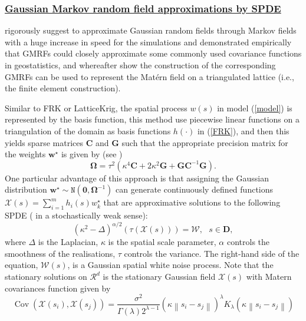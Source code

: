 \documentclass[
12pt, %
a4paper, %
oneside, %
headinclude,footinclude, %
BCOR5mm, %
]{scrartcl}
\begin{document}
\subsubsection{\href{http://www.r-inla.org/}{Gaussian Markov random field approximations by SPDE}}
\href{https://chenyw68.github.io/Literature/[2005]Gaussian markov random fields theory and applications.pdf}{\citet{rue2005gaussian}} rigorously suggest to approximate \textcolor[rgb]{0.50,0.50,0.50}{Gaussian random fields} through \textcolor[rgb]{0.50,0.50,0.50}{Markov fields} with a huge increase in speed for the simulations and demonstrated empirically that GMRFs could
closely approximate some commonly used covariance functions in geostatistics, and whereafter \href{https://chenyw68.github.io/Literature/[2011]An explicit link between GF and GMRFs the SPDE approach.pdf}{\citet{lindgren2011explicit}} show the construction of the corresponding GMRFs can be used to represent the Matérn field on a triangulated lattice (i.e., the finite element construction).

Similar to FRK or LatticeKrig, the spatial process $w(s)$ in model (\ref{model}) is represented by the basis function,  this method
use piecewise linear functions on a triangulation of the domain as basis functions $h(\cdot)$ in (\ref{FRK}), and then this yields sparse matrices $\boldsymbol{C}$ and $\boldsymbol{G}$ such that the appropriate precision matrix for the weights $\boldsymbol{w}^{\star}$ is given by (see \href{https://chenyw68.github.io/Literature/[2015]Spatial and Spatio temporal Bayesian Models with R INLA.pdf}{\citep{blangiardo2015spatial}})
\begin{equation*}
\boldsymbol{\Omega} = \tau^2(\kappa^4\boldsymbol{C} + 2\kappa^2\boldsymbol{G} + \boldsymbol{G}\boldsymbol{C}^{-1}\boldsymbol{G}).
\end{equation*}
One particular advantage of this approach is that
assigning the Gaussian distribution $\boldsymbol{w}^{\star} \sim \texttt{N}(\boldsymbol{0}, \boldsymbol{\Omega}^{-1})$ can generate continuously defined functions $\mathcal{X}(s) = \sum_{i = 1}^{m}h_i(s)w_k^{\star} $ that are approximative solutions to the following SPDE ( in a stochastically weak sense):
\begin{equation*}
  (\kappa^2 - \Delta)^{\alpha/2}\left(\tau(\mathcal{X}(s))\right) = \mathcal{W}, ~~~ s \in \boldsymbol{D},
\end{equation*}
where $\Delta$ is the Laplacian, $\kappa$ is the spatial scale parameter, $\alpha$ controls the smoothness of the
realisations, $\tau$ controls the variance. The right-hand side of the equation, $\mathcal{W}(s)$, is a Gaussian spatial white noise process. Note that the stationary solutions on $\mathcal{R}^d$ is \textcolor[rgb]{0.50,0.50,0.50}{the stationary Gaussian field $\mathcal{X}(s)$ with Matern covariances function} given by
\begin{equation}
\operatorname{Cov}\left(\mathcal{X}\left(s_{i}\right), \mathcal{X}\left(s_{j}\right)\right)= \frac{\sigma^{2}}{\Gamma(\lambda) 2^{\lambda-1}}\left(\kappa\left\|s_{i}-s_{j}\right\|\right)^{\lambda} K_{\lambda}\left(\kappa\left\|s_{i}-s_{j}\right\|\right)
\end{equation}
\end{document}
